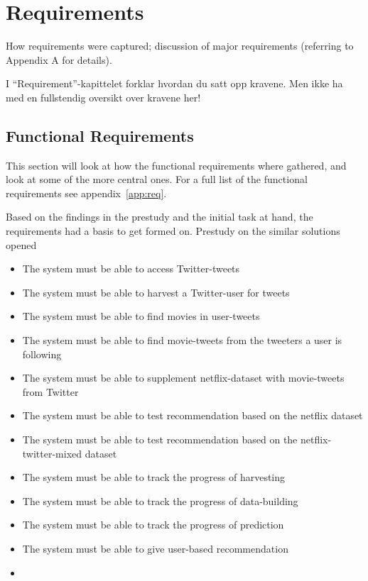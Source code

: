 
\chapter{Requirements}

\minitoc

How requirements  were  captured;
  discussion  of  major requirements
(referring  to  Appendix  A for details).

I “Requirement”-kapittelet forklar hvordan du satt opp kravene.
Men ikke ha med en fullstendig oversikt over kravene her!


\clearpage

\section{Functional Requirements}
This section will look at how the functional requirements where gathered, and look at some of the more central ones. For a full list of the functional requirements see appendix~\ref{app:req}.

Based on the findings in the prestudy and the initial task at hand, the requirements had a basis to get formed on. Prestudy on the similar solutions opened

\begin{itemize}
  \item The system must be able to access Twitter-tweets
  \item The system must be able to harvest a Twitter-user for tweets
  \item The system must be able to find movies in user-tweets
  \item The system must be able to find movie-tweets from the tweeters a user is following

  \item The system must be able to supplement netflix-dataset with movie-tweets from Twitter
  \item The system must be able to test recommendation based on the netflix dataset
  \item The system must be able to test recommendation based on the netflix-twitter-mixed dataset
  \item The system must be able to track the progress of harvesting
  \item The system must be able to track the progress of data-building
  \item The system must be able to track the progress of prediction
  \item The system must be able to give user-based recommendation
  \item
\end{itemize}

